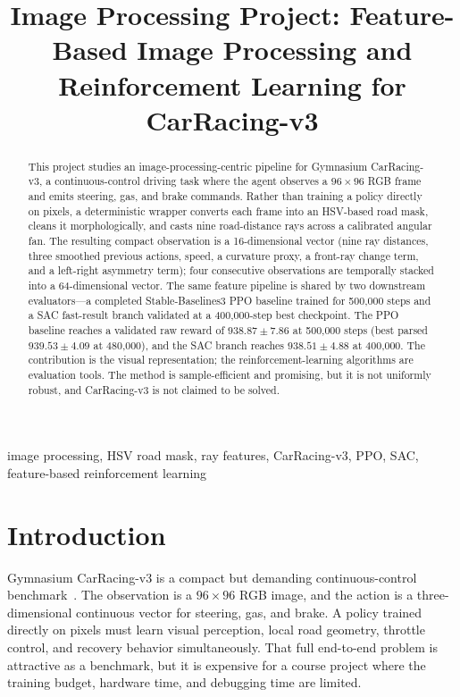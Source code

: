 \documentclass[conference]{IEEEtran}
\begin{document}
\title{Image Processing Project: Feature-Based Image Processing and Reinforcement Learning for CarRacing-v3}

\author{
}

\maketitle

\begin{abstract}
This project studies an image-processing-centric pipeline for Gymnasium
CarRacing-v3, a continuous-control driving task where the agent observes a
$96\times96$ RGB frame and emits steering, gas, and brake commands. Rather than
training a policy directly on pixels, a deterministic wrapper converts each
frame into an HSV-based road mask, cleans it morphologically, and casts nine
road-distance rays across a calibrated angular fan. The resulting compact
observation is a 16-dimensional vector (nine ray distances, three smoothed
previous actions, speed, a curvature proxy, a front-ray change term, and a
left-right asymmetry term); four consecutive observations are temporally
stacked into a 64-dimensional vector. The same feature pipeline is shared by
two downstream evaluators---a completed Stable-Baselines3 PPO baseline trained
for 500{,}000 steps and a SAC fast-result branch validated at a 400{,}000-step
best checkpoint. The PPO baseline reaches a validated raw reward of
$938.87\pm7.86$ at 500{,}000 steps (best parsed $939.53\pm4.09$ at 480{,}000),
and the SAC branch reaches $938.51\pm4.88$ at 400{,}000. The contribution is
the visual representation; the reinforcement-learning algorithms are evaluation
tools. The method is sample-efficient and promising, but it is not uniformly
robust, and CarRacing-v3 is not claimed to be solved.
\end{abstract}

\begin{IEEEkeywords}
image processing, HSV road mask, ray features, CarRacing-v3, PPO, SAC, feature-based reinforcement learning
\end{IEEEkeywords}

\section{Introduction}

Gymnasium CarRacing-v3 is a compact but demanding continuous-control
benchmark~\cite{ref_gym}. The observation is a $96\times96$ RGB image, and the
action is a three-dimensional continuous vector for steering, gas, and brake. A
policy trained directly on pixels must learn visual perception, local road
geometry, throttle control, and recovery behavior simultaneously. That full
end-to-end problem is attractive as a benchmark, but it is expensive for a
course project where the training budget, hardware time, and debugging time are
limited.
\end{document}
